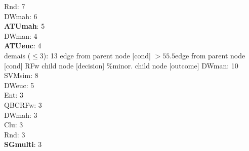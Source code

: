 {{{{Rnd: 7\\
DWmah: 6\\
\textbf{ATUmah}: 5\\
DWman: 4\\
\textbf{ATUeuc}: 4\\
demais ($\leq 3$): 13} edge from parent node [cond] {$>55.5$}}edge from parent node [cond] {RFw}}
child {node [decision] {\%minor.}
child {node [outcome] {
DWman: 10\\
SVMsim: 8\\
DWeuc: 5\\
Ent: 3\\
QBCRFw: 3\\
DWmah: 3\\
Clu: 3\\
Rnd: 3\\
\textbf{SGmulti}: 3\\
}}}}
